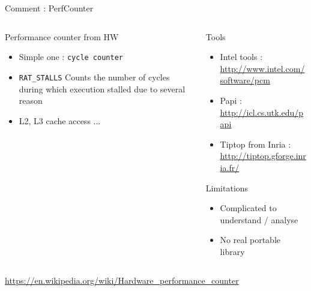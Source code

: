 %
\begin{Frame}{Comment : PerfCounter}
  \begin{columns}[t]
    \begin{column}{5cm} %
      \begin{block}{Performance counter from HW}
        \begin{itemize}
        \item Simple one : \texttt{cycle counter}
        \item \texttt{RAT\_STALLS} Counts the number of cycles during which execution stalled due to several reason
        \item L2, L3 cache access ...
        \end{itemize}
      \end{block} 
    \end{column}
    
    \begin{column}{5cm} %
      \begin{block}{Tools}
        \begin{itemize}
        \item Intel tools : \url{http://www.intel.com/software/pcm}
        \item Papi : \url{http://icl.cs.utk.edu/papi}
        \item Tiptop from Inria : \url{http://tiptop.gforge.inria.fr/}
        \end{itemize}
      \end{block}   
      \begin{alertblock}{Limitations}
        \begin{itemize}
        \item Complicated to understand / analyse
        \item No real portable library
        \end{itemize}
      \end{alertblock}   
    \end{column}
  \end{columns}  
\url{https://en.wikipedia.org/wiki/Hardware_performance_counter}
\end{Frame}



